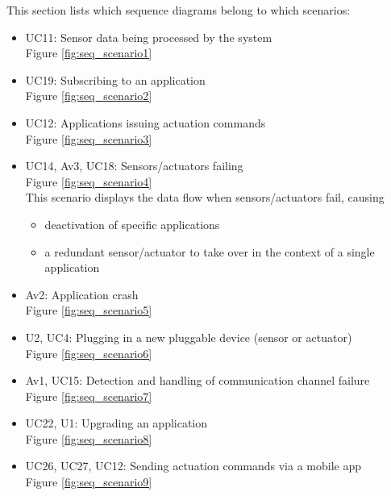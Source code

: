    This section lists which sequence diagrams belong to which scenarios:
    \begin{itemize}
        \item UC11: Sensor data being processed by the system \\
              Figure \ref{fig:seq_scenario1}

        \item UC19: Subscribing to an application \\
              Figure \ref{fig:seq_scenario2}

        \item UC12: Applications issuing actuation commands \\
              Figure \ref{fig:seq_scenario3}

        \item UC14, Av3, UC18: Sensors/actuators failing \\
              Figure \ref{fig:seq_scenario4} \\
              This scenario displays the data flow when sensors/actuators fail, causing
              \begin{itemize}
                  \item deactivation of specific applications
                  \item a redundant sensor/actuator to take over in the context of a single application
              \end{itemize}

        \item Av2: Application crash \\
              Figure \ref{fig:seq_scenario5}

        \item U2, UC4: Plugging in a new pluggable device (sensor or actuator) \\
              Figure \ref{fig:seq_scenario6}

        \item Av1, UC15: Detection and handling of communication channel failure \\
              Figure \ref{fig:seq_scenario7}

        \item UC22, U1: Upgrading an application \\
              Figure \ref{fig:seq_scenario8}

        \item UC26, UC27, UC12: Sending actuation commands via a mobile app \\
              Figure \ref{fig:seq_scenario9}
    \end{itemize}

